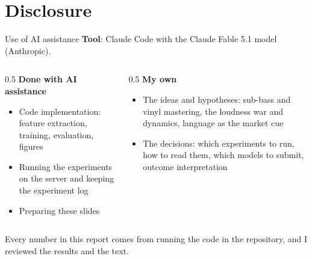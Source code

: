 \documentclass[aspectratio=169,11pt]{beamer}
\begin{document}
\section{Disclosure}
\begin{frame}{Use of AI assistance}
  \textbf{Tool}: Claude Code with the Claude Fable 5.1 model (Anthropic).
  \vspace{0.6em}

  \begin{columns}[T]
    \begin{column}{0.5\textwidth}
      \textbf{Done with AI assistance}
      \begin{itemize}\small
        \item Code implementation: feature extraction, training, evaluation, figures
        \item Running the experiments on the server and keeping the experiment log
        \item Preparing these slides
      \end{itemize}
    \end{column}
    \begin{column}{0.5\textwidth}
      \textbf{My own}
      \begin{itemize}\small
        \item The ideas and hypotheses: sub-bass and vinyl mastering, the loudness war and dynamics, language as the market cue
        \item The decisions: which experiments to run, how to read them, which models to submit, outcome interpretation
      \end{itemize}
    \end{column}
  \end{columns}
  \vspace{0.8em}
  {\small Every number in this report comes from running the code in the repository, and I reviewed the results and the text.\par}
\end{frame}

\end{document}

